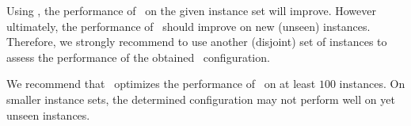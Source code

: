 \begin{note}
Using \piclasp, the performance of \clasp\ on the given instance set will improve.
However ultimately, the performance of \clasp\ should improve on new (unseen) instances.
Therefore, we strongly recommend to use another (disjoint) set of instances to assess the performance of the obtained \clasp\ configuration.
\end{note}

\begin{note}
We recommend that \piclasp\ optimizes the performance of \clasp\ on at least $100$ instances.
On smaller instance sets, the determined configuration may not perform well on yet unseen instances.
\end{note}


